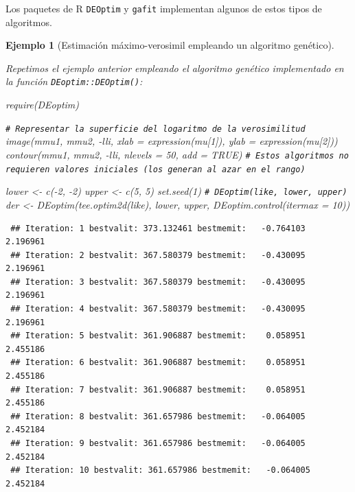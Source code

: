 \documentclass[
  10pt,
]{book}
\newenvironment{Shaded}{\begin{snugshade}}{\end{snugshade}}
\newcommand{\AttributeTok}[1]{\textcolor[rgb]{0.77,0.63,0.00}{#1}}
\newcommand{\CommentTok}[1]{\textcolor[rgb]{0.56,0.35,0.01}{\textit{#1}}}
\newcommand{\ConstantTok}[1]{\textcolor[rgb]{0.00,0.00,0.00}{#1}}
\newcommand{\DecValTok}[1]{\textcolor[rgb]{0.00,0.00,0.81}{#1}}
\newcommand{\FunctionTok}[1]{\textcolor[rgb]{0.00,0.00,0.00}{#1}}
\newcommand{\NormalTok}[1]{#1}
\newcommand{\OtherTok}[1]{\textcolor[rgb]{0.56,0.35,0.01}{#1}}
\newcommand{\SpecialCharTok}[1]{\textcolor[rgb]{0.00,0.00,0.00}{#1}}
\theoremstyle{break}
\newtheorem{example}{Ejemplo}[chapter]
\theoremstyle{nonumberplain}
\renewcommand{\CommentTok}[1]{\textcolor[rgb]{0.41,0.41,0.41}{\texttt{#1}}}
\begin{document}
Los paquetes de R \texttt{DEOptim} y \texttt{gafit} implementan algunos de estos
tipos de algoritmos.

\begin{example}[Estimación máximo-verosimil empleando un algoritmo genético]
\protect\hypertarget{exm:mv-DEoptim}{}\label{exm:mv-DEoptim}

Repetimos el ejemplo anterior empleando el algoritmo genético implementado en la función \texttt{DEoptim::DEOptim()}:

\begin{Shaded}
\begin{Highlighting}[]
\FunctionTok{require}\NormalTok{(DEoptim)}

\CommentTok{\# Representar la superficie del logaritmo de la verosimilitud}
\FunctionTok{image}\NormalTok{(mmu1, mmu2, }\SpecialCharTok{{-}}\NormalTok{lli, }\AttributeTok{xlab =} \FunctionTok{expression}\NormalTok{(mu[}\DecValTok{1}\NormalTok{]), }\AttributeTok{ylab =} \FunctionTok{expression}\NormalTok{(mu[}\DecValTok{2}\NormalTok{]))}
\FunctionTok{contour}\NormalTok{(mmu1, mmu2, }\SpecialCharTok{{-}}\NormalTok{lli, }\AttributeTok{nlevels =} \DecValTok{50}\NormalTok{, }\AttributeTok{add =} \ConstantTok{TRUE}\NormalTok{)}
\CommentTok{\# Estos algoritmos no requieren valores iniciales (los generan al azar en el rango)}

\NormalTok{lower }\OtherTok{\textless{}{-}} \FunctionTok{c}\NormalTok{(}\SpecialCharTok{{-}}\DecValTok{2}\NormalTok{, }\SpecialCharTok{{-}}\DecValTok{2}\NormalTok{)}
\NormalTok{upper }\OtherTok{\textless{}{-}} \FunctionTok{c}\NormalTok{(}\DecValTok{5}\NormalTok{, }\DecValTok{5}\NormalTok{)}
\FunctionTok{set.seed}\NormalTok{(}\DecValTok{1}\NormalTok{)}
\CommentTok{\# DEoptim(like, lower, upper)}
\NormalTok{der }\OtherTok{\textless{}{-}} \FunctionTok{DEoptim}\NormalTok{(}\FunctionTok{tee.optim2d}\NormalTok{(like), lower, upper, }\FunctionTok{DEoptim.control}\NormalTok{(}\AttributeTok{itermax =} \DecValTok{10}\NormalTok{))}
\end{Highlighting}
\end{Shaded}

\begin{verbatim}
 ## Iteration: 1 bestvalit: 373.132461 bestmemit:   -0.764103    2.196961
 ## Iteration: 2 bestvalit: 367.580379 bestmemit:   -0.430095    2.196961
 ## Iteration: 3 bestvalit: 367.580379 bestmemit:   -0.430095    2.196961
 ## Iteration: 4 bestvalit: 367.580379 bestmemit:   -0.430095    2.196961
 ## Iteration: 5 bestvalit: 361.906887 bestmemit:    0.058951    2.455186
 ## Iteration: 6 bestvalit: 361.906887 bestmemit:    0.058951    2.455186
 ## Iteration: 7 bestvalit: 361.906887 bestmemit:    0.058951    2.455186
 ## Iteration: 8 bestvalit: 361.657986 bestmemit:   -0.064005    2.452184
 ## Iteration: 9 bestvalit: 361.657986 bestmemit:   -0.064005    2.452184
 ## Iteration: 10 bestvalit: 361.657986 bestmemit:   -0.064005    2.452184
\end{verbatim}


\end{example}
\end{document}
